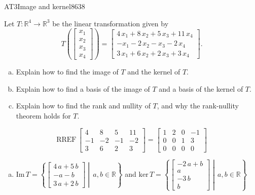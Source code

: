 \begin{exercise}{AT3}{Image and kernel}{8638} 
\begin{exerciseStatement} 

 Let \(T:\mathbb{R}^4 \to \mathbb{R}^3\) be the linear transformation given by \[T\left( \left[\begin{array}{c}
x_{1} \\
x_{2} \\
x_{3} \\
x_{4}
\end{array}\right] \right) = \left[\begin{array}{c}
4 \, x_{1} + 8 \, x_{2} + 5 \, x_{3} + 11 \, x_{4} \\
-x_{1} - 2 \, x_{2} - x_{3} - 2 \, x_{4} \\
3 \, x_{1} + 6 \, x_{2} + 2 \, x_{3} + 3 \, x_{4}
\end{array}\right].\] 

 

\begin{enumerate}[(a)]
\item Explain how to find the image of \(T\) and the kernel of \(T\).
\item Explain how to find a basis of the image of \(T\) and a basis of the kernel of \(T\).
\item Explain how to find the rank and nullity of \(T\), and why the rank-nullity theorem holds for \(T\).
\end{enumerate}

     \end{exerciseStatement}
 \begin{exerciseAnswer} 

\[\mathrm{RREF}\,\left[\begin{array}{cccc}
4 & 8 & 5 & 11 \\
-1 & -2 & -1 & -2 \\
3 & 6 & 2 & 3
\end{array}\right]=\left[\begin{array}{cccc}
1 & 2 & 0 & -1 \\
0 & 0 & 1 & 3 \\
0 & 0 & 0 & 0
\end{array}\right]\]

 

\begin{enumerate}[(a)]
\item  

 \(\mathrm{Im}\,T =  \left\{ \left[\begin{array}{c}
4 \, a + 5 \, b \\
-a - b \\
3 \, a + 2 \, b
\end{array}\right] \middle|\,a,b\in\mathbb{R}\right\}\) and \(\mathrm{ker}\,T = \left\{ \left[\begin{array}{c}
-2 \, a + b \\
a \\
-3 \, b \\
b
\end{array}\right] \middle|\,a,b\in\mathbb{R}\right\}\) 


\end{enumerate}
\end{exerciseAnswer}
\end{exercise}
